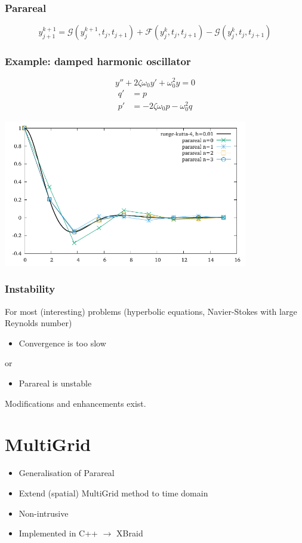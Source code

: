\documentclass[aspectratio=169]{beamer}
\begin{document}
    \begin{frame}
        \frametitle{Parareal}
        \[y_{j+1}^{k+1} = \mathcal{G}(y^{k+1}_j, t_j, t_{j+1}) + \mathcal{F}(y^k_j, t_j, t_{j+1}) - \mathcal{G}(y^k_j, t_j, t_{j+1})\]
    \end{frame}

    \begin{frame}
        \frametitle{Example: damped harmonic oscillator}
        \[y'' + 2\zeta \omega_0 y' + \omega_0^2 y = 0\]\vspace{20pt}
        \[\begin{aligned}
            q' &= p\\
            p' &= -2\zeta \omega_0 p - \omega_0^2 q
        \end{aligned}\]
    \end{frame}
    \begin{frame}
        \begin{center}
        \includegraphics[width=0.8\textwidth]{plot1.pdf}
        \end{center}
    \end{frame}

    \begin{frame}
        \frametitle{Instability}
        For most (interesting) problems (hyperbolic equations, Navier-Stokes with large Reynolds number) 
        \begin{itemize}
            \item Convergence is too slow
        \end{itemize}
        or
        \begin{itemize}
            \item Parareal is unstable
        \end{itemize}
        Modifications and enhancements exist.
    \end{frame}

    \section{MultiGrid}
    \begin{frame}
        \begin{itemize}
            \item Generalisation of Parareal
            \item Extend (spatial) MultiGrid method to time domain
            \item Non-intrusive
            \item Implemented in C++ $\to$ XBraid
        \end{itemize}
    \end{frame}
\end{document}
